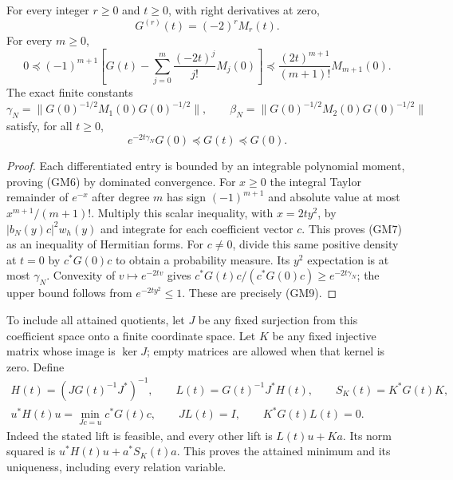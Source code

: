 \begin{hzoctheorem}
For every integer $r\geq0$ and $t\geq0$, with right derivatives at zero,
\begin{equation}\tag{GM6}
 G^{(r)}(t)=(-2)^rM_r(t).
\end{equation}
For every $m\geq0$,
\begin{equation}\tag{GM7}
 0\preceq(-1)^{m+1}
 \left[G(t)-\sum_{j=0}^m\frac{(-2t)^j}{j!}M_j(0)\right]
 \preceq\frac{(2t)^{m+1}}{(m+1)!}M_{m+1}(0).
\end{equation}
The exact finite constants
\begin{equation}\tag{GM8}
 \gamma_N=\|G(0)^{-1/2}M_1(0)G(0)^{-1/2}\|,
 \qquad
 \beta_N=\|G(0)^{-1/2}M_2(0)G(0)^{-1/2}\|
\end{equation}
satisfy, for all $t\geq0$,
\begin{equation}\tag{GM9}
 e^{-2t\gamma_N}G(0)\preceq G(t)\preceq G(0).
\end{equation}
\end{hzoctheorem}
\begin{proof}
Each differentiated entry is bounded by an integrable polynomial
moment, proving (GM6) by dominated convergence.  For $x\geq0$ the
integral Taylor remainder of $e^{-x}$ after degree $m$ has sign
$(-1)^{m+1}$ and absolute value at most $x^{m+1}/(m+1)!$.
Multiply this scalar inequality, with $x=2ty^2$, by
$|b_N(y)c|^2w_h(y)$ and integrate for each coefficient vector $c$.
This proves (GM7) as an inequality of Hermitian forms.
For $c\ne0$, divide this same positive density at $t=0$ by $c^*G(0)c$
to obtain a probability measure.  Its $y^2$ expectation is at most
$\gamma_N$.  Convexity of $v\mapsto e^{-2tv}$ gives
$c^*G(t)c/(c^*G(0)c)\geq e^{-2t\gamma_N}$; the upper bound follows
from $e^{-2ty^2}\leq1$.  These are precisely (GM9).
\end{proof}

To include all attained quotients, let $J$ be any fixed surjection
from this coefficient space onto a finite coordinate space.  Let $K$
be any fixed injective matrix whose image is $\ker J$; empty matrices
are allowed when that kernel is zero.  Define
\begin{equation}\tag{GM10}
 \begin{gathered}
 H(t)=(JG(t)^{-1}J^*)^{-1},\qquad
 L(t)=G(t)^{-1}J^*H(t),\qquad S_K(t)=K^*G(t)K,\\
 u^*H(t)u=\min_{Jc=u}c^*G(t)c,\qquad JL(t)=I,
 \qquad K^*G(t)L(t)=0.
 \end{gathered}
\end{equation}
Indeed the stated lift is feasible, and every other lift is $L(t)u+Ka$.
Its norm squared is $u^*H(t)u+a^*S_K(t)a$.  This proves the attained
minimum and its uniqueness, including every relation variable.

